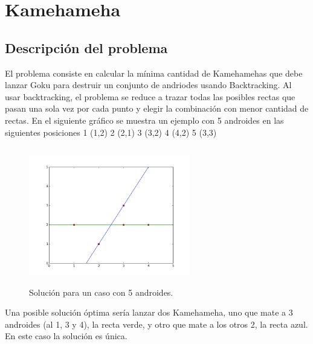 

\section{Kamehameha}

\subsection{Descripción del problema}

El problema consiste en calcular la mínima cantidad de Kamehamehas que debe lanzar Goku para destruir un conjunto de andriodes usando Backtracking.
Al usar backtracking, el problema se reduce a trazar todas las posibles rectas que pasan una sola vez por cada punto y elegir la combinación con menor cantidad de rectas. En el siguiente gráfico se muestra un ejemplo con 5 androides en las siguientes posiciones
1 (1,2) 2 (2,1) 3 (3,2) 4 (4,2) 5 (3,3)
\begin{figure}[h!]
  \centering
  \includegraphics[width=7cm, height=6cm]{ejemploHame1}
  \caption{Solución para un caso con 5 androides.}
\end{figure}

Una posible solución óptima sería lanzar dos Kamehameha, uno que mate a 3 androides (al 1, 3 y 4), la recta verde, y otro que mate a los otros 2, la recta azul. En este caso la solución es única.

